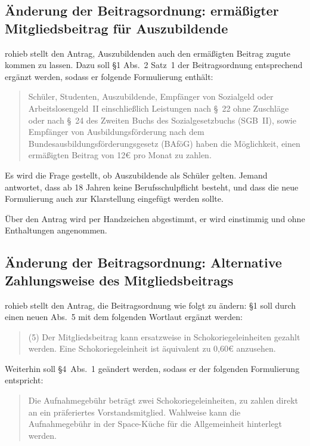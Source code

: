 \documentclass[a4paper,12pt]{scrartcl}
\begin{document}
\subsection{Änderung der Beitragsordnung: ermäßigter Mitgliedsbeitrag für
Auszubildende}

rohieb stellt den Antrag, Auszubildenden auch den ermäßigten Beitrag zugute
kommen zu lassen. Dazu soll §1 Abs.~2 Satz~1 der Beitragsordnung entsprechend
ergänzt werden, sodass er folgende Formulierung enthält:
\begin{quote}
  Schüler, Studenten, Auszubildende, Empfänger von Sozialgeld oder
  Arbeitslosengeld~II einschließlich Leistungen nach §~22 ohne Zuschläge oder
  nach §~24 des Zweiten Buchs des Sozialgesetzbuchs (SGB~II), sowie Empfänger
  von Ausbildungsförderung nach dem Bundesausbildungsförderungsgesetz (BAföG)
  haben die Möglichkeit, einen ermäßigten Beitrag von 12€ pro Monat zu zahlen.
\end{quote}

Es wird die Frage gestellt, ob Auszubildende als Schüler gelten. Jemand
antwortet, dass ab 18 Jahren keine Berufsschulpflicht besteht, und dass die neue
Formulierung auch zur Klarstellung eingefügt werden sollte.

Über den Antrag wird per Handzeichen abgestimmt, er wird einstimmig und ohne
Enthaltungen angenommen.

\subsection{Änderung der Beitragsordnung: Alternative Zahlungsweise des
Mitgliedsbeitrags}

rohieb stellt den Antrag, die Beitragsordnung wie folgt zu ändern: §1 soll
durch einen neuen Abs.~5 mit dem folgenden Wortlaut ergänzt werden:
\begin{quote}
  (5) Der Mitgliedsbeitrag kann ersatzweise in Schokoriegeleinheiten gezahlt
  werden. Eine Schokoriegeleinheit ist äquivalent zu 0,60€ anzusehen.
\end{quote}
Weiterhin soll §4~Abs.~1 geändert werden, sodass er der folgenden Formulierung
entspricht:
\begin{quote}
  Die Aufnahmegebühr beträgt zwei Schokoriegeleinheiten, zu zahlen direkt an ein
  präferiertes Vorstandsmitglied. Wahlweise kann die Aufnahmegebühr in der
  Space-Küche für die Allgemeinheit hinterlegt werden.
\end{quote}
\end{document}
